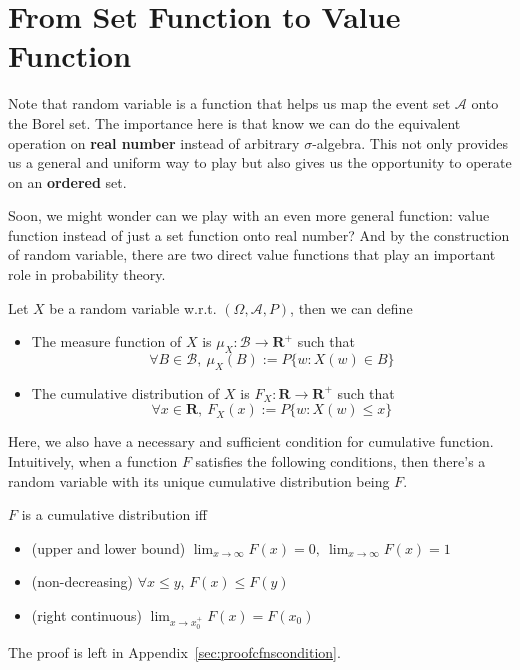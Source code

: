 \documentclass[../Probability_Theory.tex]{subfiles}
\begin{document}
\section{From Set Function to Value Function}
Note that random variable is a function that helps us map the event set $\mathcal{A}$ onto the Borel set. The importance here is that know we can do the equivalent operation on {\bf real number} instead of arbitrary $\sigma$-algebra. This not only provides us a general and uniform way to play but also gives us the opportunity to operate on an {\bf ordered} set.

Soon, we might wonder can we play with an even more general function: value function instead of just a set function onto real number? And by the construction of random variable, there are two direct value functions that play an important role in probability theory.
\begin{theorem}
	Let $X$ be a random variable w.r.t. $(\Omega,\mathcal{A},P)$, then we can define
	\begin{itemize}
		\item The measure function of $X$ is $\mu_X:\mathcal{B}\rightarrow\mathbf{R}^+$ such that $$\forall B\in\mathcal{B},\ \mu_X(B):=P\{w:X(w)\in B\}$$
		\item The cumulative distribution of $X$ is $F_X:\mathbf{R}\rightarrow\mathbf{R}^+$ such that $$\forall x\in\mathbf{R},\ F_X(x):=P\{w:X(w)\leq x \}$$
	\end{itemize}
\end{theorem}

Here, we also have a necessary and sufficient condition for cumulative function. Intuitively, when a function $F$ satisfies the following conditions, then there's a random variable with its unique cumulative distribution being $F$.

\begin{theorem}\label{cdnscondition}
	$F$ is a cumulative distribution iff
	\begin{itemize}
		\item (upper and lower bound) $\lim_{x\rightarrow\infty}F(x)=0,\ \lim_{x\rightarrow\infty}F(x) = 1$
		\item (non-decreasing) $\forall x\leq y$, $F(x)\leq F(y)$
		\item (right continuous) $\lim_{x\rightarrow x_0^+}F(x) = F(x_0)$
	\end{itemize}
\end{theorem}
The proof is left in Appendix~\ref{sec:proofcfnscondition}.
\end{document}
